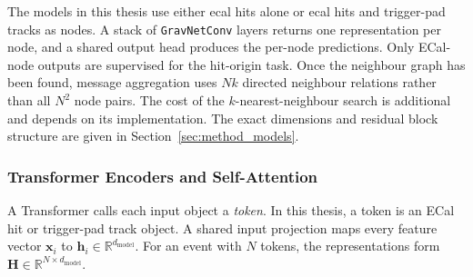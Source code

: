 

The models in this thesis use either \gls{ecal} hits alone or \gls{ecal} hits
and trigger-pad tracks as nodes. A stack of \texttt{GravNetConv} layers
returns one representation per node, and a shared output head produces the
per-node predictions. Only ECal-node outputs are supervised for the
hit-origin task. Once the neighbour graph has been found, message aggregation
uses \(Nk\) directed neighbour relations rather than all \(N^2\) node pairs.
The cost of the \(k\)-nearest-neighbour search is additional and depends on
its implementation. The exact dimensions and residual block structure are
given in Section~\ref{sec:method_models}.









\subsubsection{Transformer Encoders and Self-Attention}
\label{sec:transformer_encoder_background}

A Transformer calls each input object a \emph{token}. In this thesis, a token
is an ECal hit or trigger-pad track object. A shared input projection maps every
feature vector \(\mathbf{x}_i\) to
\(\mathbf{h}_i\in\mathbb{R}^{d_{\mathrm{model}}}\). For an event with \(N\)
tokens, the representations form
\(\mathbf{H}\in\mathbb{R}^{N\times d_{\mathrm{model}}}\).


